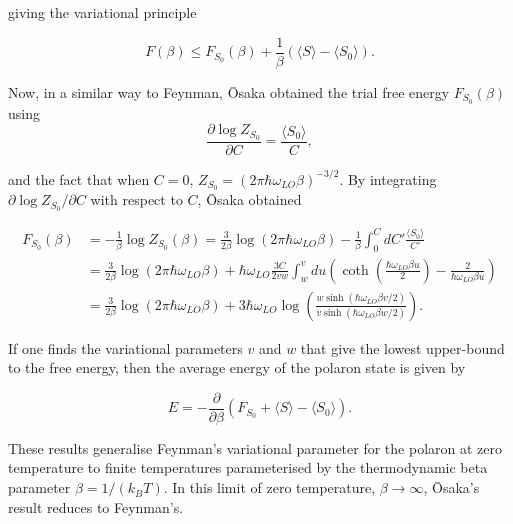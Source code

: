 giving the variational principle

\begin{equation}\label{eqn:osaka_var}
    F(\beta) \leq F_{S_0}(\beta) + \frac{1}{\beta} \left( \langle S\rangle - \langle S_0 \rangle \right).
\end{equation}

Now, in a similar way to Feynman, \=Osaka obtained the trial free energy $F_{S_0}(\beta)$ using
\begin{equation}
     \frac{\partial \log Z_{S_0}}{\partial C} = \frac{\langle S_0 \rangle}{C},
\end{equation}

and the fact that when $C = 0$, $Z_{S_0} = (2\pi\hbar\omega_{LO}\beta)^{-3/2}$. By integrating $\partial \log Z_{S_0} / \partial C$ with respect to $C$, \=Osaka obtained

\begin{equation}\label{eqn:osaka_trial_fenergy}
\begin{aligned}
    F_{S_0}(\beta) &= -\frac{1}{\beta} \log Z_{S_0}(\beta) = \frac{3}{2\beta} \log(2\pi\hbar\omega_{LO}\beta) - \frac{1}{\beta}\int^C_0 dC' \frac{\langle S_0 \rangle}{C'} \\
    &= \frac{3}{2\beta} \log(2\pi\hbar\omega_{LO}\beta) + \hbar\omega_{LO} \frac{3C}{2vw} \int_w^v du \left( \coth \left( \frac{\hbar\omega_{LO} \beta u}{2}\right) - \frac{2}{\hbar\omega_{LO}\beta u} \right) \\
    &= \frac{3}{2\beta} \log(2\pi\hbar\omega_{LO}\beta) + 3 \hbar \omega_{LO} \log \left( \frac{w \sinh \left( \hbar\omega_{LO} \beta v / 2 \right)}{v \sinh \left( \hbar\omega_{LO} \beta w / 2 \right)} \right).
\end{aligned}
\end{equation}

If one finds the variational parameters $v$ and $w$ that give the lowest upper-bound to the free energy, then the average energy of the polaron state is given by

\begin{equation}
    E = -\frac{\partial}{\partial \beta} \left( F_{S_0} + \langle S\rangle - \langle S_0 \rangle \right).
\end{equation}

These results generalise Feynman's variational parameter for the polaron at zero temperature to finite temperatures parameterised by the thermodynamic beta parameter $\beta = 1 / (k_B T)$. In this limit of zero temperature, $\beta \to \infty$, \=Osaka's result reduces to Feynman's.

